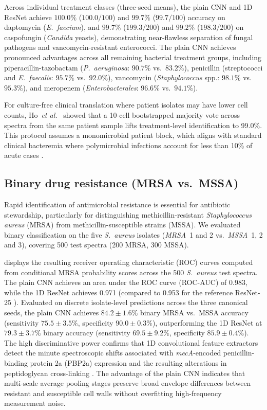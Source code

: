 \documentclass[journal,onecolumn]{IEEEtran}
\begin{document}
Across individual treatment classes (three-seed means), the plain CNN and 1D ResNet
achieve $100.0\%$ ($100.0/100$) and $99.7\%$ ($99.7/100$) accuracy on daptomycin
(\textit{E.~faecium}), and $99.7\%$ ($199.3/200$) and $99.2\%$ ($198.3/200$) on
caspofungin (\textit{Candida} yeasts), demonstrating near-flawless separation
of fungal pathogens and vancomycin-resistant enterococci. The plain CNN achieves
pronounced advantages across all remaining bacterial treatment groups, including
piperacillin-tazobactam (\textit{P.~aeruginosa}: $90.7\%$ vs.\ $83.2\%$),
penicillin (streptococci and \textit{E.~faecalis}: $95.7\%$ vs.\ $92.0\%$),
vancomycin (\textit{Staphylococcus} spp.: $98.1\%$ vs.\ $95.3\%$), and
meropenem (\textit{Enterobacterales}: $96.6\%$ vs.\ $94.1\%$).

For culture-free clinical translation where patient isolates may have lower
cell counts, Ho~\textit{et al.}~\cite{ho2019rapid} showed that a 10-cell
bootstrapped majority vote across spectra from the same patient sample lifts
treatment-level identification to 99.0\%. This protocol assumes a monomicrobial
patient block, which aligns with standard clinical bacteremia where polymicrobial
infections account for less than 10\% of acute cases \cite{weinstein1997clinical}.

\subsection{Binary drug resistance (MRSA vs.\ MSSA)}
\label{sec:res-mrsa}
Rapid identification of antimicrobial resistance is essential for antibiotic
stewardship, particularly for distinguishing methicillin-resistant
\textit{Staphylococcus aureus} (MRSA) from methicillin-susceptible strains (MSSA).
We evaluated binary classification on the five \textit{S.~aureus} isolates
(\textit{MRSA}~1 and 2 vs.\ \textit{MSSA}~1, 2 and 3), covering 500 test
spectra (200 MRSA, 300 MSSA).

 displays the resulting receiver operating characteristic (ROC)
curves computed from conditional MRSA probability scores across the 500
\textit{S.~aureus} test spectra. The plain CNN achieves an area under the ROC
curve (ROC-AUC) of 0.983, while the 1D ResNet achieves 0.971 (compared to 0.953
for the reference ResNet-25 \cite{ho2019rapid}). Evaluated on discrete
isolate-level predictions across the three canonical seeds, the plain CNN achieves
$84.2 \pm 1.6\%$ binary MRSA vs.\ MSSA accuracy (sensitivity $75.5 \pm 3.5\%$,
specificity $90.0 \pm 0.3\%$), outperforming the 1D ResNet at $79.3 \pm 3.7\%$
binary accuracy (sensitivity $69.5 \pm 9.2\%$, specificity $85.9 \pm 0.4\%$).
The high discriminative power confirms that 1D convolutional
feature extractors detect the minute spectroscopic shifts associated with
\textit{mecA}-encoded penicillin-binding protein 2a (PBP2a) expression and the
resulting alterations in peptidoglycan cross-linking \cite{peacock2015mechanisms}. The advantage of
the plain CNN indicates that multi-scale average pooling stages preserve broad
envelope differences between resistant and susceptible cell walls without
overfitting high-frequency measurement noise.
\end{document}
